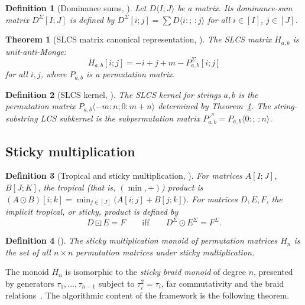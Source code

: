 \documentclass[10pt]{article}
\newtheorem{definition}{Definition}
\newtheorem{theorem}{Theorem}
\newcommand{\stick}{\boxdot}
\begin{document}
\begin{definition}[Dominance sums, {\cite[Definition 10]{GZT25}}]
Let $D\langle I;J\rangle$ be a matrix. Its \emph{dominance-sum matrix}
$D^\Sigma[I;J]$ is defined by
$D^\Sigma[i;j]=\sum D\langle i:;\,:j\rangle$ for all $i\in[I]$, $j\in[J]$.
\end{definition}

\begin{theorem}[SLCS matrix canonical representation,
{\cite[Theorem 33]{GZT25}}]\label{thm:canon}
The SLCS matrix $H_{a,b}$ is unit-anti-Monge:
\[
H_{a,b}[i;j]=-i+j+m-P^\Sigma_{a,b}[i;j]
\]
for all $i,j$, where $P_{a,b}$ is a permutation matrix.
\end{theorem}

\begin{definition}[SLCS kernel, {\cite[Definition 34]{GZT25}}]
The \emph{SLCS kernel} for strings $a,b$ is the permutation matrix
$P_{a,b}\langle-m:n;0:m+n\rangle$ determined by Theorem~\ref{thm:canon}. The
\emph{string-substring LCS subkernel} is the subpermutation matrix
$P^{\nearrow}_{a,b}=P_{a,b}\langle 0:;\,:n\rangle$.
\end{definition}

\subsection{Sticky multiplication}

\begin{definition}[Tropical and sticky multiplication,
{\cite[Definitions 11, 12]{GZT25}}]
For matrices $A[I;J]$, $B[J;K]$, the \emph{tropical} (that is, $(\min,+)$)
product is
$(A\odot B)[i;k]=\min_{j\in[J]}\bigl(A[i;j]+B[j;k]\bigr)$. For matrices
$D,E,F$, the \emph{implicit tropical}, or \emph{sticky}, product is defined by
\[
D\stick E=F
\qquad\text{iff}\qquad
D^\Sigma\odot E^\Sigma=F^\Sigma .
\]
\end{definition}

\begin{definition}[{\cite[Definition 13]{GZT25}}]
The \emph{sticky multiplication monoid of permutation matrices} $H_n$ is the
set of all $n\times n$ permutation matrices under sticky multiplication.
\end{definition}

The monoid $H_n$ is isomorphic to the \emph{sticky braid monoid} of degree
$n$, presented by generators $\tau_1,\ldots,\tau_{n-1}$ subject to
$\tau_i^2=\tau_i$, far commutativity and the braid
relations~\cite[Definition 15, Theorem 19]{GZT25}. The algorithmic content of
the framework is the following theorem.
\end{document}

